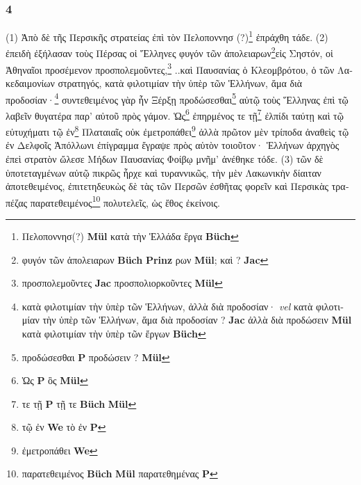 \subsubsection*{4} \textgreek{(1) Ἀπὸ δὲ τῆς Περσικῆς στρατείας ἐπὶ τὸν Πελοποννησ (?)}\footnote{\textgreek{Πελοποννησ}(?) \textbf{Mül} \textgreek{κατὰ τὴν Ἑλλάδα ἔργα}  \textbf{Büch}} \textgreek{ἐπράχθη τάδε. (2) ἐπειδὴ ἐξήλασαν τοὺς Πέρσας οἱ Ἕλληνες φυγόν τῶν ἀπολειαρων}\footnote{\textgreek{φυγόν τῶν ἀπολειαρων}  \textbf{Büch}   \textbf{Prinz} \textgreek{ρων} \textbf{Mül}; \textgreek{ καὶ} ? \textbf{Jac}}\textgreek{εἰς Σηστόν, οἱ Ἀθηναῖοι προσέμενον προσπολεμοῦντες,}\footnote{ \textgreek{προσπολεμοῦντες}  \textbf{Jac} \textgreek{προσπολιορκοῦντες} \textbf{Mül}} ..\textgreek{καὶ Παυσανίας ὁ Κλεομβρότου, ὁ τῶν Λακεδαιμονίων στρατηγός, κατὰ φιλοτιμίαν τὴν ὑπὲρ τῶν Ἑλλήνων, ἅμα διὰ προδοσίαν}·\footnote{\textgreek{ κατὰ φιλοτιμίαν τὴν ὑπὲρ τῶν Ἑλλήνων, ἀλλὰ διὰ προδοσίαν·} \textit{vel} \textgreek{κατὰ φιλοτιμίαν τὴν ὑπὲρ τῶν Ἑλλήνων, ἅμα  διὰ προδοσίαν }? \textbf{Jac} \textgreek{ ἀλλὰ διὰ προδώσειν} \textbf{Mül} \textgreek{κατὰ φιλοτιμίαν τὴν ὑπὲρ τῶν ἔργων}  \textbf{Büch}} \textgreek{συντεθειμένος γὰρ ἦν Ξέρξῃ προδώσεσθαι}\footnote{\textgreek{προδώσεσθαι}  \textbf{P} \textgreek{προδώσειν} ? \textbf{Mül}} \textgreek{αὐτῷ τοὺς Ἕλληνας ἐπὶ τῷ λαβεῖν θυγατέρα παρ’ αὐτοῦ πρὸς γάμον. Ὡς}\footnote{\textgreek{Ὡς}  \textbf{P} \textgreek{ὃς} \textbf{Mül}} \textgreek{ἐπηρμένος τε τῇ}\footnote{\textgreek{τε τῇ}  \textbf{P} \textgreek{τῇ τε}  \textbf{Büch} \textbf{Mül}} \textgreek{ἐλπίδι ταύτῃ καὶ τῷ εὐτυχήματι τῷ ἐν}\footnote{\textgreek{τῷ ἐν}  \textbf{We} \textgreek{τὸ ἐν}  \textbf{P}} \textgreek{Πλαταιαῖς οὐκ ἐμετροπάθει}\footnote{\textgreek{ἐμετροπάθει}  \textbf{We}} \textgreek{ἀλλὰ πρῶτον μὲν τρίποδα ἀναθεὶς τῷ ἐν Δελφοῖς  Ἀπόλλωνι ἐπίγραμμα ἔγραψε πρὸς αὑτὸν τοιοῦτον· Ἑλλήνων ἀρχηγὸς ἐπεὶ στρατὸν ὤλεσε Μήδων Παυσανίας Φοίβῳ μνῆμ’ ἀνέθηκε τόδε. (3) τῶν δὲ ὑποτεταγμένων αὐτῷ πικρῶς ἦρχε καὶ τυραννικῶς, τὴν μὲν Λακωνικὴν δίαιταν ἀποτεθειμένος, ἐπιτετηδευκὼς δὲ τὰς τῶν Περσῶν ἐσθῆτας φορεῖν καὶ Περσικὰς τραπέζας παρατεθειμένος}\footnote{\textgreek{παρατεθειμένος}  \textbf{Büch} \textbf{Mül} \textgreek{παρατεθημένας}  \textbf{P}} \textgreek{πολυτελεῖς, ὡς ἔθος ἐκείνοις.}

